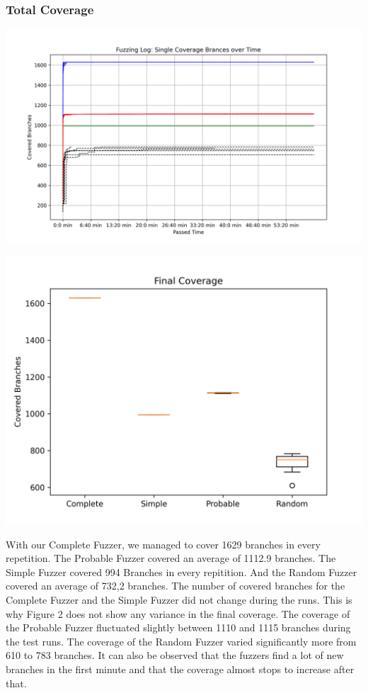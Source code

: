 \documentclass[runningheads]{llncs}
\begin{document}
\subsubsection{Total Coverage}
\begin{center}
\includegraphics[width=\textwidth]{img/complete_coverage}
\label{fig1}
\end{center}
\begin{center}
\includegraphics[width=\textwidth]{img/boxplot_coverage}
\label{fig2}
\end{center}
With our Complete Fuzzer, we managed to cover 1629 branches in every repetition. The Probable Fuzzer covered an average of 1112.9 branches. The Simple Fuzzer covered 994 Branches in every repitition. And the Random Fuzzer covered an average of 732,2 branches.\newline
The number of covered branches for the Complete Fuzzer and the Simple Fuzzer did not change during the runs. This is why Figure 2 does not show any variance in the final coverage. The coverage of the Probable Fuzzer fluctuated slightly between 1110 and 1115 branches during the test runs. The coverage of the Random Fuzzer varied significantly more from 610 to 783 branches.\newline
It can also be observed that the fuzzers find a lot of new branches in the first minute and that the coverage almost stops to increase after that.
\end{document}
